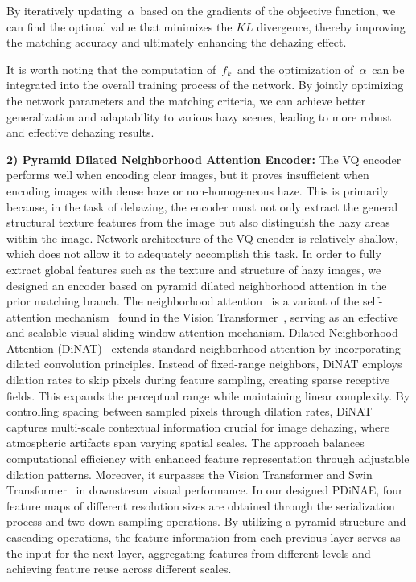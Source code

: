 \documentclass[journal]{IEEEtran}
\begin{document}
By iteratively updating $\alpha$ based on the gradients of the objective function, we can find the optimal value that minimizes the $KL$ divergence, thereby improving the matching accuracy and ultimately enhancing the dehazing effect.

It is worth noting that the computation of $f_{k}$ and the optimization of $\alpha$ can be integrated into the overall training process of the network. By jointly optimizing the network parameters and the matching criteria, we can achieve better generalization and adaptability to various hazy scenes, leading to more robust and effective dehazing results.

	{\bf{2) Pyramid Dilated Neighborhood Attention Encoder:}} The VQ encoder performs well when encoding clear images, but it proves insufficient when encoding images with dense haze or non-homogeneous haze. This is primarily because, in the task of dehazing, the encoder must not only extract the general structural texture features from the image but also distinguish the hazy areas within the image. Network architecture of the VQ encoder is relatively shallow, which does not allow it to adequately accomplish this task. In order to fully extract global features such as the texture and structure of hazy images, we designed an encoder based on pyramid dilated neighborhood attention in the prior matching branch. The neighborhood attention~\cite{hassani2023neighborhood} is a variant of the self-attention mechanism~\cite{vaswani2017attention} found in the Vision Transformer~\cite{dosovitskiy2020image}, serving as an effective and scalable visual sliding window attention mechanism. Dilated Neighborhood Attention (DiNAT)~\cite{hassani2022dilated} extends standard neighborhood attention by incorporating dilated convolution principles. Instead of fixed-range neighbors, DiNAT employs dilation rates to skip pixels during feature sampling, creating sparse receptive fields. This expands the perceptual range while maintaining linear complexity. By controlling spacing between sampled pixels through dilation rates, DiNAT captures multi-scale contextual information crucial for image dehazing, where atmospheric artifacts span varying spatial scales. The approach balances computational efficiency with enhanced feature representation through adjustable dilation patterns. Moreover, it surpasses the Vision Transformer and Swin Transformer~\cite{liu2021swin} in downstream visual performance. In our designed PDiNAE, four feature maps of different resolution sizes are obtained through the serialization process and two down-sampling operations. By utilizing a pyramid structure and cascading operations, the feature information from each previous layer serves as the input for the next layer, aggregating features from different levels and achieving feature reuse across different scales.
\end{document}
